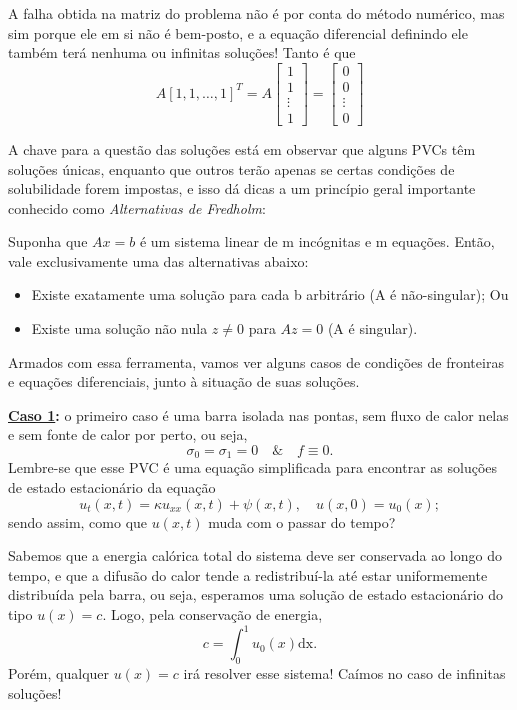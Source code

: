 \documentclass[../differential_methods.tex]{subfiles}
\begin{document}
\begin{example}
	A falha obtida na matriz do problema não é por conta do método numérico, mas sim porque ele em si não é bem-posto, e a equação diferencial definindo ele também terá nenhuma ou infinitas soluções! Tanto é que
	\[
		A[1,1,\dotsc ,1]^{T} = A \begin{bmatrix}
			1      \\
			1      \\
			\vdots \\
			1
		\end{bmatrix} = \begin{bmatrix}
			0      \\
			0      \\
			\vdots \\
			0
		\end{bmatrix}
	\]
\end{example}
A chave para a questão das soluções está em observar que alguns PVCs têm soluções únicas, enquanto que outros terão apenas se certas condições de solubilidade forem impostas, e isso dá dicas a um princípio geral importante conhecido como \textit{Alternativas de Fredholm}:
\hypertarget{fredholm_alternative}{
	\begin{theorem*}
		Suponha que \(Ax = b\) é um sistema linear de m incógnitas e m equações. Então, vale exclusivamente uma das alternativas abaixo:
		\begin{itemize}
			\item[1)] Existe exatamente uma solução para cada b arbitrário (A é não-singular); Ou
			\item[2)] Existe uma solução não nula \(z\neq 0\) para \(Az=0\) (A é singular).
		\end{itemize}
	\end{theorem*}
}
Armados com essa ferramenta, vamos ver alguns casos de condições de fronteiras e equações diferenciais, junto à situação de suas soluções.

\textbf{\underline{Caso 1}:} o primeiro caso é uma barra isolada nas pontas, sem fluxo de calor nelas e sem fonte de calor por perto, ou seja,
\[
	\sigma_{0}=\sigma_{1}=0 \quad\&\quad f\equiv 0.
\]
Lembre-se que esse PVC é uma equação simplificada para encontrar as soluções de estado estacionário da equação
\[
	u_{t}(x, t)=\kappa u_{xx}(x, t)+\psi (x, t),\quad u(x,0)=u_{0}(x);
\]
sendo assim, como que \(u(x, t)\) muda com o passar do tempo?

Sabemos que a energia calórica total do sistema deve ser conservada ao longo do tempo, e que a difusão do calor tende a redistribuí-la até estar uniformemente distribuída pela barra, ou seja, esperamos uma solução de estado estacionário do tipo \(u(x)=c\). Logo, pela conservação de energia,
\[
	c = \int_{0}^{1}u_{0}(x) \mathrm{dx}.
\]
Porém, qualquer \(u(x)=c\) irá resolver esse sistema! Caímos no caso de infinitas soluções!
\end{document}
